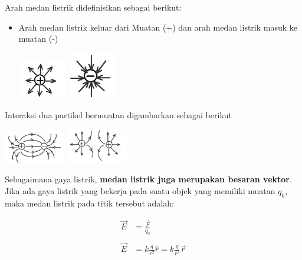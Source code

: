 \documentclass[twocolumn, 11pt]{article}%
\begin{document}
        Arah medan listrik didefinisikan sebagai berikut:
        \begin{itemize}
            \item Arah medan listrik keluar dari Muatan (+) dan arah medan listrik masuk ke muatan (-)\\
                \begin{center}
                \includegraphics[width=80px]{1.png}
                \includegraphics[width=80px]{2.png}
                \end{center}
        \end{itemize}
        
        Interaksi dua partikel bermuatan digambarkan sebagai berikut
        \begin{center}
            \includegraphics[width=100px]{3.png}
            \includegraphics[width=100px]{4.png}
        \end{center}

        Sebagaimana gaya listrik, \textbf{medan listrik juga merupakan besaran vektor}. Jika ada gaya listrik yang bekerja pada suatu objek yang memiliki muatan $q_0$, maka medan listrik pada titik tersebut adalah:

        \begin{equation*}
            \begin{split}
            \vec E &= \frac{\vec F}{q_0}\\\\
            \vec E &= k \frac{q}{r^2} \hat r = k \frac{q}{r^3} \vec r
            \end{split}
        \end{equation*}
        
\end{document}
